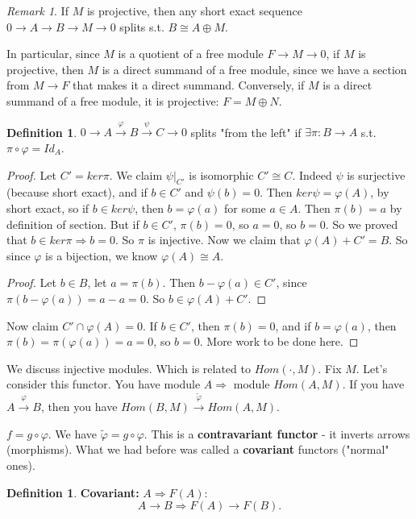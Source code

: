 \documentclass[9pt,reqno,twoside]{amsbook}
\theoremstyle{plain}
\numberwithin{section}{chapter}
\numberwithin{equation}{chapter}
\theoremstyle{definition}
\newtheorem{Def}[theorem]{Definition}
\theoremstyle{remark}
\newtheorem{rem}[theorem]{Remark}
\theoremstyle{plain}
\renewcommand{\phi}{\varphi}
\begin{document}
\begin{rem}
If $M$ is projective, then any short exact sequence $0 \to A \to B \to M \to 0$ splits s.t. $B \cong A \oplus M$. 
\end{rem}

In particular, since $M$ is a quotient of a free module $F \to M \to 0$, if $M$ is projective, then $M$ is a direct summand of a free module, since we have a section from $M \to F$ that makes it a direct summand. Conversely, if $M$ is a direct summand of a free module, it is projective: $F = M \oplus N$. 

\begin{Def}
$0 \to A \overset{\phi}{\to} B \overset{\psi}{\to } C \to 0$ splits "from the left" if $\exists \pi:B \to A$ s.t. $\pi\circ \phi = Id_A$. 
\end{Def}
\begin{proof}
 Let $C' = ker\pi$. We claim $\psi|_{C'}$ is isomorphic $C' \cong C$. Indeed $\psi$ is surjective (because short exact), and if $b \in C'$ and $\psi(b) = 0$. Then $ker\psi = \phi(A)$, by short exact, so if $b \in ker\psi$, then $b = \phi(a)$ for some $a \in A$. Then $\pi(b) = a$ by definition of section. But if $b \in C'$, $\pi(b) = 0$, so $a = 0$, so $b = 0$. So we proved that $b \in ker\pi \Rightarrow b = 0$. So $\pi$ is injective. Now we claim that $\phi(A) + C' = B$. So since $\phi$ is a bijection, we know $\phi(A) \cong A$. 
 \begin{proof}
 Let $b \in B$, let $a = \pi(b)$. Then $b - \phi(a) \in C'$, since $\pi(b - \phi(a)) = a - a = 0$. So $b \in \phi(A) + C'$. 
 \end{proof}
 Now claim $C' \cap  \phi(A) = 0$. If $b \in C'$, then $\pi(b) = 0$, and if $b = \phi(a)$, then $\pi(b) = \pi(\phi(a)) = a = 0$, so $b = 0$. More work to be done here. 
\end{proof}


We discuss injective modules. Which is related to $Hom(\cdot,M)$. Fix $M$. Let's consider this functor. You have module $A \Rightarrow$ module $ Hom(A,M)$. If you have $A \overset{\phi}{\to} B$, then you have $Hom(B,M) \overset{\tilde{\phi}}{\to} Hom(A,M)$. 
\begin{center}
$f = g \circ \phi$. We have $\tilde{\phi} = g \circ \phi$. This is a \textbf{contravariant functor} - it inverts arrows (morphisms). What we had before was called a \textbf{covariant} functors ("normal" ones). 
\end{center}
\begin{Def}
\textbf{Covariant: } $A \Rightarrow F(A)$:
$$
A \to B \Rightarrow F(A) \to F(B).
$$
\end{Def}
\end{document}

